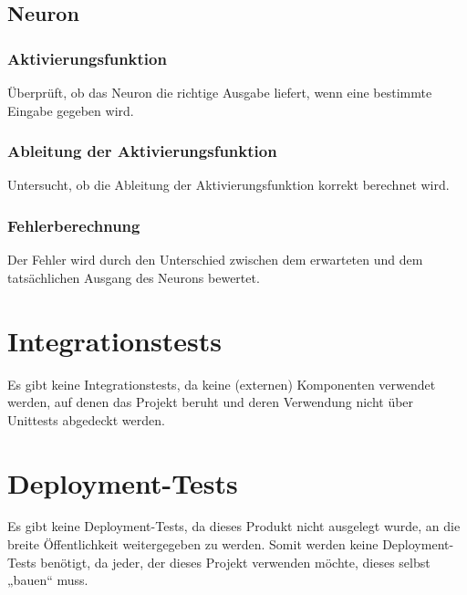 \subsection{Neuron}
\label{sec:DesignNeuron}
\subsubsection{Aktivierungsfunktion}
\label{sec:DesignAktivierungsfunktion}
Überprüft, ob das Neuron die richtige Ausgabe liefert, wenn eine bestimmte Eingabe gegeben wird.
\subsubsection{Ableitung der Aktivierungsfunktion}
\label{sec:DesignAbleitungDerAktivierungsfunktion}
Untersucht, ob die Ableitung der Aktivierungsfunktion korrekt berechnet wird.
\subsubsection{Fehlerberechnung  }
\label{sec:DesignFehlerberechnung}
Der Fehler wird durch den Unterschied zwischen dem erwarteten und dem tatsächlichen Ausgang des Neurons bewertet.

\section{Integrationstests}
Es gibt keine Integrationstests, da keine (externen) Komponenten verwendet werden, auf denen das Projekt beruht und deren Verwendung nicht über Unittests abgedeckt werden.

\section{Deployment-Tests}
Es gibt keine Deployment-Tests, da dieses Produkt nicht ausgelegt wurde, an die breite Öffentlichkeit weitergegeben zu werden.
Somit werden keine Deployment-Tests benötigt, da jeder, der dieses Projekt verwenden möchte, dieses selbst „bauen“ muss.
